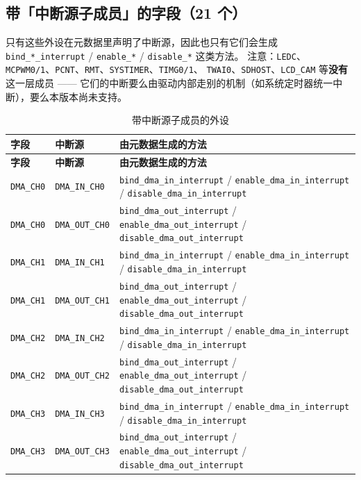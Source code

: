 \documentclass[UTF8,a4paper,11pt,fontset=fandol]{ctexart}
\newcommand{\fld}[1]{\texttt{#1}}
\newcommand{\tblhead}[1]{\textbf{#1}}
\begin{document}
\newpage
\subsection{带「中断源子成员」的字段（21 个）}

只有这些外设在元数据里声明了中断源，因此也只有它们会生成
\fld{bind\_*\_interrupt} / \fld{enable\_*} / \fld{disable\_*} 这类方法。
注意：\fld{LEDC}、\fld{MCPWM0/1}、\fld{PCNT}、\fld{RMT}、\fld{SYSTIMER}、\fld{TIMG0/1}、
\fld{TWAI0}、\fld{SDHOST}、\fld{LCD\_CAM} 等\textbf{没有}这一层成员
—— 它们的中断要么由驱动内部走别的机制（如系统定时器统一中断），要么本版本尚未支持。

\begin{center}\footnotesize
\begin{longtable}{@{}p{2.2cm}p{2.85cm}>{\raggedright\arraybackslash}p{7.55cm}@{}}
\caption{带中断源子成员的外设}\label{tab:ints}\\
\toprule
\tblhead{字段} & \tblhead{中断源} & \tblhead{由元数据生成的方法} \\
\midrule
\endfirsthead
\toprule
\tblhead{字段} & \tblhead{中断源} & \tblhead{由元数据生成的方法} \\
\midrule
\endhead
\bottomrule
\endlastfoot
\fld{DMA\_CH0} & \fld{DMA\_IN\_CH0} & \fld{bind\_dma\_in\_interrupt} / \fld{enable\_dma\_in\_interrupt} / \fld{disable\_dma\_in\_interrupt} \\
\fld{DMA\_CH0} & \fld{DMA\_OUT\_CH0} & \fld{bind\_dma\_out\_interrupt} / \fld{enable\_dma\_out\_interrupt} / \fld{disable\_dma\_out\_interrupt} \\
\fld{DMA\_CH1} & \fld{DMA\_IN\_CH1} & \fld{bind\_dma\_in\_interrupt} / \fld{enable\_dma\_in\_interrupt} / \fld{disable\_dma\_in\_interrupt} \\
\fld{DMA\_CH1} & \fld{DMA\_OUT\_CH1} & \fld{bind\_dma\_out\_interrupt} / \fld{enable\_dma\_out\_interrupt} / \fld{disable\_dma\_out\_interrupt} \\
\fld{DMA\_CH2} & \fld{DMA\_IN\_CH2} & \fld{bind\_dma\_in\_interrupt} / \fld{enable\_dma\_in\_interrupt} / \fld{disable\_dma\_in\_interrupt} \\
\fld{DMA\_CH2} & \fld{DMA\_OUT\_CH2} & \fld{bind\_dma\_out\_interrupt} / \fld{enable\_dma\_out\_interrupt} / \fld{disable\_dma\_out\_interrupt} \\
\fld{DMA\_CH3} & \fld{DMA\_IN\_CH3} & \fld{bind\_dma\_in\_interrupt} / \fld{enable\_dma\_in\_interrupt} / \fld{disable\_dma\_in\_interrupt} \\
\fld{DMA\_CH3} & \fld{DMA\_OUT\_CH3} & \fld{bind\_dma\_out\_interrupt} / \fld{enable\_dma\_out\_interrupt} / \fld{disable\_dma\_out\_interrupt} \\

\end{longtable}
\end{center}
\end{document}
